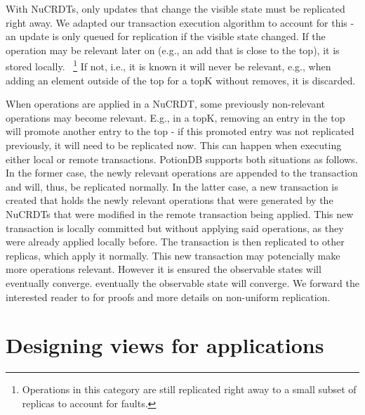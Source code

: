 \documentclass{vldb}
\begin{document}
With NuCRDTs, only updates that change the visible state must be replicated right away.
We adapted our transaction execution algorithm to account for this - an update is only queued for replication if the visible state changed. 
If the operation may be relevant later on (e.g., an add that is close to the top), it is stored locally. ~\footnote{Operations in this category are still replicated right away to a small subset of replicas to account for faults.}
If not, i.e., it is known it will never be relevant, e.g., when adding an element outside of the top for a topK without removes, it is discarded.


When operations are applied in a NuCRDT, some previously non-relevant operations may become relevant.
E.g., in a topK, removing an entry in the top will promote another entry to the top - if this promoted entry was not replicated previously, it will need to be replicated now.
This can happen when executing either local or remote transactions.
PotionDB supports both situations as follows.
In the former case, the newly relevant operations are appended to the transaction and will, thus, be replicated normally.
In the latter case, a new transaction is created that holds the newly relevant operations that were generated by the NuCRDTs that were modified in the remote transaction being applied.
This new transaction is locally committed but without applying said operations, as they were already applied locally before.
The transaction is then replicated to other replicas, which apply it normally.
This new transaction may potencially make more operations relevant.
However it is ensured the observable states will eventually converge.
eventually the observable state will converge.
We forward the interested reader to \cite{Cabrita17Nonuniform} for proofs and more details on non-uniform replication.

\section{Designing views for applications}
\label{sec:views_for_apps}
\end{document}
